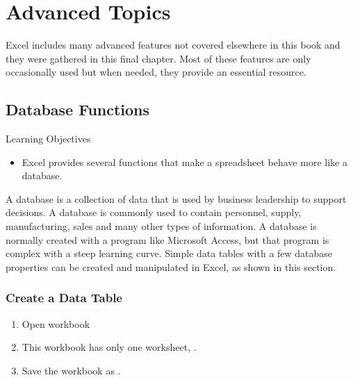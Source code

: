 \chapter{Advanced Topics}\label{ch09:topics}

Excel includes many advanced features not covered elsewhere in this book and they were gathered in this final chapter. Most of these features are only occasionally used but when needed, they provide an essential resource.

\section{Database Functions}

\begin{center}
	\begin{objbox}{Learning Objectives}
		\begin{itemize}
			\setlength{\itemsep}{0pt}
			\setlength{\parskip}{0pt}
			\setlength{\parsep}{0pt}
			
			\item Excel provides several functions that make a spreadsheet behave more like a database.
		\end{itemize}
	\end{objbox}
\end{center}

A database is a collection of data that is used by business leadership to support decisions. A database is commonly used to contain personnel, supply, manufacturing, sales and many other types of information. A database is normally created with a program like Microsoft Access, but that program is complex with a steep learning curve. Simple data tables with a few database properties can be created and manipulated in Excel, as shown in this section.

\subsection{Create a Data Table}

\begin{enumerate}
	\item Open workbook 
	\item This workbook has only one worksheet, .
	\item Save the workbook as .
\end{enumerate}

